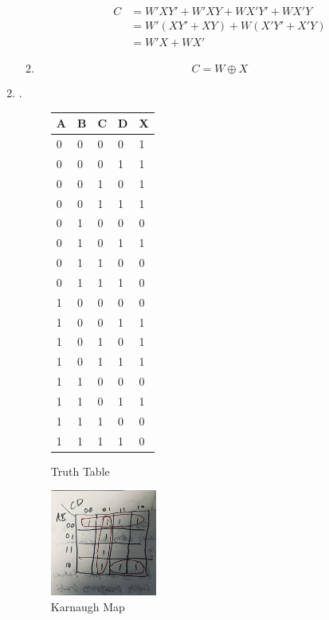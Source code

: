 \documentclass[10pt]{article}
\begin{document}
\begin{enumerate}
\begin{enumerate}
      \begin{align*}
        C&=W'XY'+W'XY+WX'Y'+WX'Y \\
         &=W'(XY'+XY)+W(X'Y'+X'Y) \\
         &=W'X+WX'
      \end{align*}
    \item 
      \begin{equation*}
        C=W\oplus X
      \end{equation*}
  \end{enumerate}
\item . \\
  \begin{figure} [H]
    \center
    \begin{tabular}{|l|l|l|l||l|}
      \hline
      \textbf{A}	 & 	\textbf{B}	 & 	\textbf{C}	 & 	\textbf{D}	 & 	\textbf{X} \\ \hline
      0	 & 	0	 & 	0	 & 	0	 & 	1 \\ \hline
      0	 & 	0	 & 	0	 & 	1	 & 	1 \\ \hline
      0	 & 	0	 & 	1	 & 	0	 & 	1 \\ \hline
      0	 & 	0	 & 	1	 & 	1	 & 	1 \\ \hline
      0	 & 	1	 & 	0	 & 	0	 & 	0 \\ \hline
      0	 & 	1	 & 	0	 & 	1	 & 	1 \\ \hline
      0	 & 	1	 & 	1	 & 	0	 & 	0 \\ \hline
      0	 & 	1	 & 	1	 & 	1	 & 	0 \\ \hline
      1	 & 	0	 & 	0	 & 	0	 & 	0 \\ \hline
      1	 & 	0	 & 	0	 & 	1	 & 	1 \\ \hline
      1	 & 	0	 & 	1	 & 	0	 & 	1 \\ \hline
      1	 & 	0	 & 	1	 & 	1	 & 	1 \\ \hline
      1	 & 	1	 & 	0	 & 	0	 & 	0 \\ \hline
      1	 & 	1	 & 	0	 & 	1	 & 	1 \\ \hline
      1	 & 	1	 & 	1	 & 	0	 & 	0 \\ \hline
      1	 & 	1	 & 	1	 & 	1	 & 	0 \\ \hline
      \end{tabular}
      \caption{Truth Table}
  \end{figure}

  \begin{figure} [H]
    \center
    \includegraphics[width=0.33\textwidth]{figures/karnaugh.jpeg}
    \caption{Karnaugh Map}
  \end{figure}


\end{enumerate}
\end{document}
